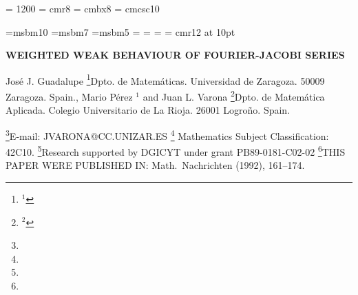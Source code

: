 
\magnification = 1200
\font \peq = cmr8
\font \peqbf = cmbx8
\font \cmcsc = cmcsc10

\font\msymnormal=msbm10
\font\msympeq=msbm7
\font\msymmuypeq=msbm5
\newfam\numeros
\textfont\numeros=\msymnormal
\scriptfont\numeros=\msympeq
\scriptscriptfont\numeros=\msymmuypeq
\def\num{\fam\numeros\msymnormal}
\def\N{{\num N}}
\def\R{{\num R}}
\font\tipo = cmr12 at 10pt
\tipo

\def \proof {{\it Proof.} }
\def \qed {\vrule height 5 pt width 5 pt depth 0 pt}

\centerline{\bf WEIGHTED WEAK BEHAVIOUR OF FOURIER-JACOBI SERIES}

\bigskip

\centerline{Jos\'e J. Guadalupe
   \footnote{$^1$}{\peq Dpto. de Matem\'aticas. Universidad de Zaragoza. 50009
Zaragoza. Spain.}, Mario P\'erez $^1$ and Juan L. Varona
   \footnote{$^2$}{\peq Dpto. de Matem\'atica Aplicada. Colegio Universitario de
La Rioja. 26001 Logro\~no. Spain.}}
\footnote{}{\peq E-mail: JVARONA@CC.UNIZAR.ES}
\footnote{}{ Mathematics Subject Classification: 42C10.}
\footnote{}{\peq Research supported by DGICYT under grant PB89-0181-C02-02}
\footnote{}{\peq THIS PAPER WERE PUBLISHED IN:
Math.\ Nachrichten {} (1992), 161--174.}


\bigskip

{\narrower\narrower{}\smallskip}

